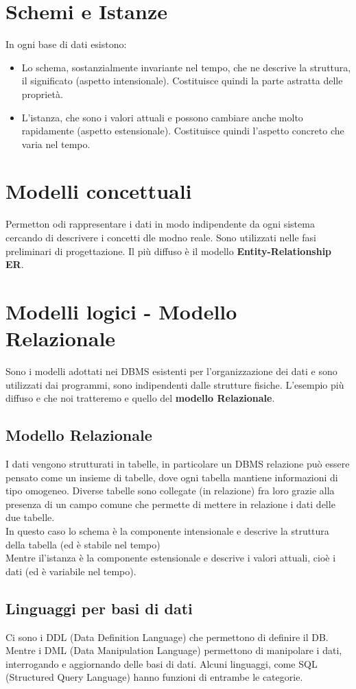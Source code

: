 \section{Schemi e Istanze}
In ogni base di dati esistono:
\begin{itemize}
    \item Lo schema, sostanzialmente invariante nel tempo, che ne descrive la struttura,
    il significato (aspetto intensionale). Costituisce quindi la parte astratta delle
    proprietà.
    \item L'istanza, che sono i valori attuali e possono cambiare anche molto rapidamente 
    (aspetto estensionale). Costituisce quindi l'aspetto concreto che varia nel tempo.
\end{itemize}
\section{Modelli concettuali}
Permetton odi rappresentare i dati in modo indipendente da ogni sistema cercando
di descrivere i concetti dle modno reale. Sono utilizzati nelle fasi preliminari di
progettazione. Il più diffuso è il modello \textbf{Entity-Relationship ER}.
\section{Modelli logici - Modello Relazionale}
Sono i modelli adottati nei DBMS esistenti per l'organizzazione dei dati e sono
utilizzati dai programmi, sono indipendenti dalle strutture fisiche.
L'esempio più diffuso e che noi tratteremo e quello del \textbf{modello Relazionale}.
\subsection{Modello Relazionale}
I dati vengono strutturati in tabelle, in particolare un DBMS relazione può essere
pensato come un insieme di tabelle, dove ogni tabella mantiene informazioni di
tipo omogeneo. Diverse tabelle sono collegate (in relazione) fra loro grazie alla
presenza di un campo comune che permette di mettere in relazione i dati delle due
tabelle.
\\ In questo caso lo schema è la componente intensionale e descrive la struttura
della tabella (ed è stabile nel tempo)
\\ Mentre il'istanza è la componente estensionale e descrive i valori attuali, cioè
i dati (ed è variabile nel tempo).
\subsection{Linguaggi per basi di dati}
Ci sono i DDL (Data Definition Language) che permettono di definire il DB.
\\ Mentre i DML (Data Manipulation Language) permettono di manipolare i dati, interrogando
e aggiornando delle basi di dati. Alcuni linguaggi, come SQL (Structured Query Language)
hanno funzioni di entrambe le categorie.

